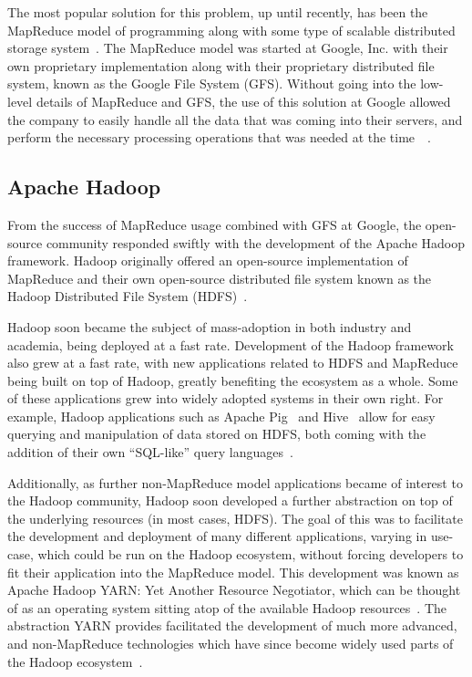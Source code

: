 \documentclass[a4paper,11pt]{article}
\begin{document}
The most popular solution for this problem, up until recently, has been the MapReduce model of programming along with
some type of scalable distributed storage system~\cite{bifet_mining_2013}. The MapReduce model was started at Google,
Inc. with their own proprietary implementation along with their proprietary distributed file system, known as the Google
File System (GFS). Without going into the low-level details of MapReduce and GFS, the use of this solution at Google
allowed the company to easily handle all the data that was coming into their servers, and perform the necessary
processing operations that was needed at the time~\cite{ghemawat_google_2003}~\cite{dean_mapreduce:_2008}.


\subsection{Apache Hadoop} %
\label{sub:apache_hadoop}

From the success of MapReduce usage combined with GFS at Google, the open-source community responded swiftly with the
development of the Apache Hadoop framework. Hadoop originally offered an open-source implementation of MapReduce and
their own open-source distributed file system known as the Hadoop Distributed File System
(HDFS)~\cite{shvachko_hadoop_2010}.

Hadoop soon became the subject of mass-adoption in both industry and academia, being deployed at a fast rate.
Development of the Hadoop framework also grew at a fast rate, with new applications related to HDFS and MapReduce being
built on top of Hadoop, greatly benefiting the ecosystem as a whole. Some of these applications grew into widely adopted
systems in their own right. For example, Hadoop applications such as Apache Pig~\cite{gates_building_2009} and
Hive~\cite{thusoo_hive_2010} allow for easy querying and manipulation of data stored on HDFS, both coming with the
addition of their own ``SQL-like'' query languages~\cite{olston_pig_2008}.

Additionally, as further non-MapReduce model applications became of interest to the Hadoop community, Hadoop soon
developed a further abstraction on top of the underlying resources (in most cases, HDFS). The goal of this was to
facilitate the development and deployment of many different applications, varying in use-case, which could be run on the
Hadoop ecosystem, without forcing developers to fit their application into the MapReduce model. This development was
known as Apache Hadoop YARN: Yet Another Resource Negotiator, which can be thought of as an operating system sitting
atop of the available Hadoop resources~\cite{vavilapalli_apache_2013}. The abstraction YARN provides facilitated the
development of much more advanced, and non-MapReduce technologies which have since become widely used parts of the
Hadoop ecosystem~\cite{harrison_hadoops_2012}.
\end{document}
